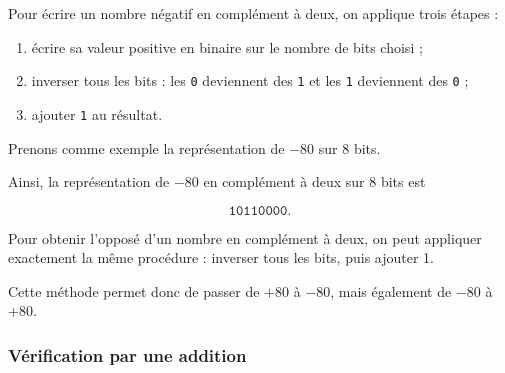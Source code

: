 \documentclass[11pt, a4paper]{book}
\begin{document}
Pour écrire un nombre négatif en complément à deux, on applique trois étapes :

\begin{enumerate}
    \item écrire sa valeur positive en binaire sur le nombre de bits choisi ;
    \item inverser tous les bits : les \texttt{0} deviennent des \texttt{1}
    et les \texttt{1} deviennent des \texttt{0} ;
    \item ajouter \texttt{1} au résultat.
\end{enumerate}

Prenons comme exemple la représentation de $-80$ sur 8 bits.

\begin{center}
\end{center}

Ainsi, la représentation de $-80$ en complément à deux sur 8 bits est

\[
    \boxed{\texttt{10110000}}.
\]

\begin{remarque}
Pour obtenir l'opposé d'un nombre en complément à deux, on peut appliquer
exactement la même procédure : inverser tous les bits, puis ajouter 1.

Cette méthode permet donc de passer de $+80$ à $-80$, mais également de
$-80$ à $+80$.
\end{remarque}

\subsubsection{Vérification par une addition}
\end{document}
